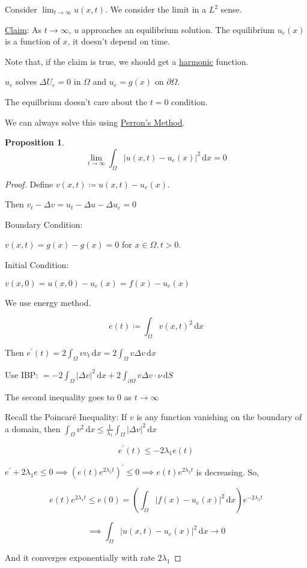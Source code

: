 \documentclass{article}
\theoremstyle{definition}
\newtheorem{proposition}{Proposition}
\begin{document}
Consider \(\displaystyle \lim_{t \to \infty} u(x,t)\). We consider the limit in a \(L^2\) sense.

\underline{Claim}: As \(t \to \infty\), \(u\) approaches an equilibrium solution. The equilibrium \(u_e(x)\) is a function of \(x\), it doesn't depend on time.

Note that, if the claim is true, we should get a \underline{harmonic} function.

\(u_e\) solves \(\Delta U_e = 0\) in \(\Omega \) and \(u_e = g(x)\) on \(\partial \Omega\).

The equilbrium doesn't care about the \(t=0\) condition.

We can always solve this using \underline{Perron's Method}.

\begin{proposition}
    \[
        \lim_{t\to\infty} \int_{\Omega }^{} \vert u(x,t)-u_e(x) \vert ^2 \,\mathrm{d}x = 0
    \]
\end{proposition}

\begin{proof}
    Define \(v(x,t)\coloneqq u(x,t)-u_e(x)\).

    Then \(v_t - \Delta v = u_t - \Delta u - \Delta u_e = 0\)
    
    Boundary Condition:

    \(v(x,t)=g(x)-g(x)=0\) for \(x\in \Omega, t>0\).

    Initial Condition:

    \(v(x,0)=u(x,0)-u_e(x)=f(x)-u_e(x)\) 

    We use energy method.

    \[
        e(t)\coloneqq \int_{\Omega }^{} v(x,t)^2 \,\mathrm{d}x 
    \]

    Then \(e^{\prime} (t) = 2 \int_{\Omega}^{} v v_t \,\mathrm{d}x = 2 \int_{\Omega }^{} v \Delta v \,\mathrm{d}x \) 

    Use IBP: \(= -2 \int_{\Omega }^{} \vert \Delta v \vert ^2 \,\mathrm{d}x + 2\int_{\partial \Omega}^{} v \Delta v\cdot\nu \,\mathrm{d}S \) 

    The second inequality goes to \(0\) as \(t \to \infty\) 

    Recall the Poincar\'e Inequality: If \(v\) is any function vanishing on the boundary of a domain, then \(\int_{\Omega }^{} v^2 \,\mathrm{d}x \leq \frac{1}{\lambda_1} \int_{\Omega}^{} \vert \Delta v \vert ^2 \,\mathrm{d}x \) 

    \[
        e^{\prime} (t) \leq -2 \lambda_1 e(t)
    \]

    \(e^{\prime} + 2\lambda_1 e \leq 0 \implies (e(t) e^{2\lambda _1 t})^{\prime} \leq 0 \implies e(t)e^{2\lambda _1 t}\) is decreasing. So,
    
    \[
        e(t)e^{2 \lambda_1 t} \leq e(0) = \left(\int_{\Omega}^{} \vert f(x) - u_e(x) \vert ^2 \,\mathrm{d}x\right) e^{-2 \lambda_1 t}
    \]

    \[
        \implies \int_{\Omega}^{} \vert u(x,t) - u_e(x) \vert ^2 \,\mathrm{d}x \to 0
    \]

    And it converges exponentially with rate \(2\lambda_1\) 

\end{proof}
\end{document}
